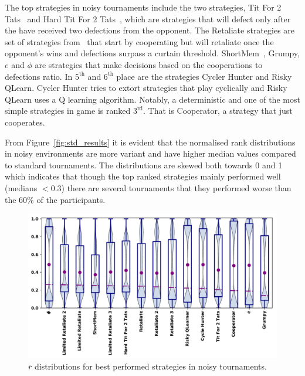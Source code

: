 \documentclass{article}
\begin{document}
The top strategies in noisy tournaments include the two strategies, Tit For 2
Tats~\cite{Axelrod1980b} and Hard Tit For 2 Tats~\cite{Stewart2012}, which are
strategies that will defect only after the have received two defections from the
opponent. The Retaliate strategies are set of strategies
from~\cite{axelrodproject} that start by cooperating but will retaliate once the
opponent's wins and defections surpass a curtain threshold.
ShortMem~\cite{Carvalho2013}, Grumpy, $e$ and $\phi$ are strategies that make
decisions based on the cooperations to defections ratio. In $5^{\text{th}}$ and
$6^{\text{th}}$ place are the strategies Cycler Hunter and  Risky QLearn. Cycler
Hunter tries to extort strategies that play cyclically and Risky QLearn uses a Q
learning algorithm. Notably, a deterministic and one of the most simple
strategies in game is ranked $3^{\text{rd}}$. That is Cooperator, a strategy
that just cooperates.

From Figure~\ref{fig:std_results} it is evident that the normalised rank distributions
in noisy environments are more variant and have higher median values compared
to standard tournaments. The distributions are skewed both towards
0 and 1 which indicates that though the top ranked strategies mainly
performed well (medians $< 0.3$) there are several tournaments that they performed
worse than the 60\% of the participants.

\begin{figure}[!htbp]
    \centering
    \includegraphics[width=.7\textwidth]{../images/performance_noise.pdf}
    \caption{\(\bar{r}\) distributions for best performed strategies in noisy tournaments.}
    \label{fig:noisy_results}
\end{figure}
\end{document}
